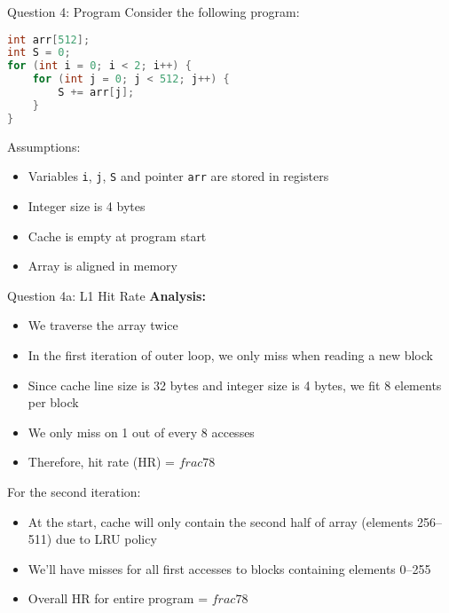\documentclass[aspectratio=169,12pt]{beamer}
\begin{document}
\begin{frame}[fragile]{Question 4: Program}
Consider the following program:

\begin{lstlisting}[language=C]
int arr[512];
int S = 0;
for (int i = 0; i < 2; i++) {
    for (int j = 0; j < 512; j++) {
        S += arr[j];
    }
}
\end{lstlisting}

Assumptions:
\begin{itemize}
    \item Variables \texttt{i}, \texttt{j}, \texttt{S} and pointer \texttt{arr} are stored in registers
    \item Integer size is 4 bytes
    \item Cache is empty at program start
    \item Array is aligned in memory
\end{itemize}
\end{frame}

\begin{frame}{Question 4a: L1 Hit Rate}
\textbf{Analysis:}
\begin{itemize}
    \item We traverse the array twice
    \item In the first iteration of outer loop, we only miss when reading a new block
    \item Since cache line size is 32 bytes and integer size is 4 bytes, we fit 8 elements per block
    \item We only miss on 1 out of every 8 accesses
    \item Therefore, hit rate (HR) = $frac{7}{8}$
\end{itemize}

For the second iteration:
\begin{itemize}
    \item At the start, cache will only contain the second half of array (elements 256--511) due to LRU policy
    \item We'll have misses for all first accesses to blocks containing elements 0--255
    \item Overall HR for entire program = $frac{7}{8}$
\end{itemize}
\end{frame}
\end{document}

